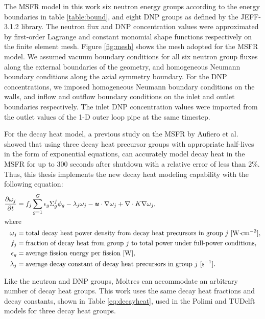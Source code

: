 The \gls{MSFR} model in this work six neutron energy groups according to the
energy boundaries in table \ref{table:bound}, and eight \gls{DNP} groups as
defined by the JEFF-3.1.2 library. The neutron flux
and \gls{DNP} concentration values were approximated by first-order Lagrange
and constant monomial shape functions respectively on the finite element mesh.
Figure \ref{fig:mesh} shows the mesh adopted for the \gls{MSFR} model.
We assumed vacuum boundary conditions for all six neutron group fluxes along
the external boundaries of the geometry, and homogeneous Neumann boundary
conditions along the axial symmetry boundary. For the \gls{DNP}
concentrations, we imposed homogeneous Neumann boundary conditions on the
walls, and inflow and outflow boundary conditions on the inlet and outlet
boundaries respectively. The inlet \gls{DNP} concentration values were
imported from the outlet values of the 1-D outer loop pipe at the same
timestep.

For the decay heat model, a previous study on the MSFR by Aufiero et al.
\cite{aufiero_extended_2013} showed that using three decay heat precursor
groups with appropriate half-lives in the form of exponential equations, can
accurately model decay heat in the MSFR for up to 300 seconds after shutdown
with a relative error of less than 2\%. Thus, this thesis implements the new
decay heat modeling capability with the following equation:
%
\begin{align}
	\frac{\partial \omega_j}{\partial t} &= f_j \sum^G_{g=1} \epsilon_{g}
	\Sigma^f_{g} \phi_{g} - \lambda_j \omega_j - \boldsymbol{u} \cdot \nabla
	\omega_j + \nabla \cdot K \nabla \omega_j, \label{eq:decayheat} \\
	\intertext{where}
    \omega_j &= \text{total decay heat power density from decay heat
    precursors in group $j$ [W$\cdot$cm$^{-3}$],} \nonumber \\
	f_j &= \text{fraction of decay heat from group $j$ to total power under
	full-power conditions,}
	\nonumber \\
	\epsilon_g &= \text{average fission energy per fission [W],} \nonumber \\
	\lambda_j &= \text{average decay constant of decay heat precursors in
	group $j$ [s$^{-1}$].} \nonumber
\end{align}

Like the neutron and \gls{DNP} groups, Moltres can accommodate an arbitrary
number of decay heat groups. This work uses the same decay heat fractions and decay constants, shown in Table
\ref{eq:decayheat}, used in the Polimi and TUDelft models for three decay heat
groups.

